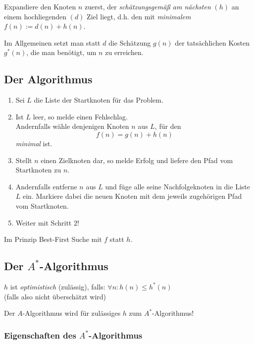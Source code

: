 \documentclass[runningheads,deutsch]{llncs}
\begin{document}
Expandiere den Knoten $n$ zuerst, der \textit{schätzungsgemäß am nächsten} $(h)$ an einem hochliegenden $(d)$ Ziel liegt, d.h. den mit \textit{minimalem} $f(n) := d(n) + h(n)$.

Im Allgemeinen setzt man statt $d$ die Schätzung $g(n)$ der tatsächlichen Kosten $g^*(n)$, die man benötigt, um $n$ zu erreichen.

\pagebreak

\subsection{Der Algorithmus}

\begin{enumerate}
    \item Sei $L$ die Liste der Startknoten für das Problem.
    \item Ist $L$ leer, so melde einen Fehlschlag. \\ Andernfalls wähle denjenigen Knoten $n$ aus $L$, für den \\
    \[ f(n) = g(n) + h(n) \]
    \textit{minimal} ist.
    \item Stellt $n$ einen Zielknoten dar, so melde Erfolg und liefere den Pfad vom Startknoten zu $n$.
    \item Andernfalls entferne $n$ aus $L$ und füge alle seine Nachfolgeknoten in die Liste $L$ ein. Markiere dabei die neuen Knoten mit dem jeweils zugehörigen Pfad vom Startknoten.
    \item Weiter mit Schritt $2$!
\end{enumerate}

Im Prinzip Best-First Suche mit $f$ statt $h$.

\subsection{Der $A^*$-Algorithmus}

$h$ ist \textit{optimistisch} (zulässig), falls: \qquad $\forall n: h(n) \leq h^*(n)$\\
(falls also nicht überschätzt wird)

\large Der $A$-Algorithmus wird für zulässiges $h$ zum $A^*$-Algorithmus! 
\normalsize

\subsubsection{Eigenschaften des $A^*$-Algorithmus}
\end{document}
